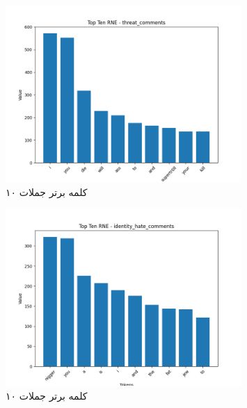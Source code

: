 \begin{figure}
  \centering
  \includegraphics[width=0.8\textwidth]{stats/top_ten_RNE_threat_comments.png}
  \caption{۱۰ کلمه برتر جملات }
  \label{fig:unique_uncommon_words_count}
\end{figure}

\begin{figure}
  \centering
  \includegraphics[width=0.8\textwidth]{stats/top_ten_RNE_identity_hate_comments.png}
  \caption{۱۰ کلمه برتر جملات }
  \label{fig:unique_uncommon_words_count}
\end{figure}

\clearpage

